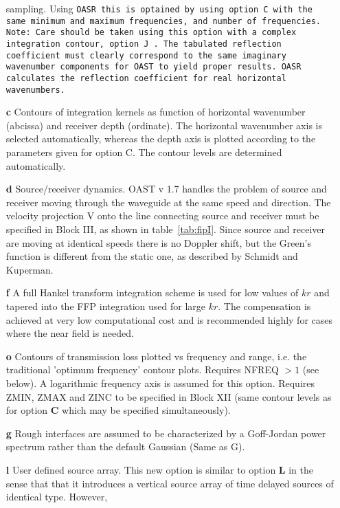 \begin{itemize}
sampling. Using \tt OASR \rm this is optained by using option \tt C
\rm with the same minimum and maximum frequencies, and number of frequencies.
Note: Care should be taken using this option with a complex
integration contour, option \tt J \rm. The tabulated reflection
coefficient must clearly correspond to the same imaginary wavenumber
components for \tt OAST \rm to yield proper results. \tt OASR \rm calculates
the reflection coefficient for real horizontal wavenumbers.
    \item[{\bf c}]     Contours   of  integration  kernels  as   function   of 
          horizontal  wavenumber  (abcissa)  and  receiver  depth           
          (ordinate). The horizontal wavenumber axis is  selected           
          automatically,  whereas  the  depth  axis  is   plotted           
          according  to  the parameters given for option  C.  The           
          contour levels are determined automatically.
\item[{\bf d}] Source/receiver dynamics. OAST v 1.7 handles the problem of
source and receiver moving through the waveguide at the same speed and
direction. The velocity projection V onto the line connecting source
and  receiver must be specified in Block III, as shown in
table~\ref{tab:fipI}. Since source and receiver are moving at identical
speeds there is no Doppler shift, but the Green's function is
different from the static one, as described by Schmidt and
Kuperman\cite{sk:jasa94}.
    \item[{\bf f}] A full Hankel transform integration scheme is used
for low values of $ kr $ and tapered into the FFP integration used for
large $ kr $. The compensation is achieved at very low computational
cost and is recommended highly for cases where the near field is
needed.   
    \item[{\bf o}] Contours of transmission loss plotted vs frequency
and range, i.e. the traditional 'optimum frequency' contour plots. 
Requires NFREQ $> 1$ (see below). A logarithmic frequency
axis is assumed for this option. Requires ZMIN, ZMAX and ZINC to be
specified in Block XII (same contour levels as for option {\bf C}
which may be specified simultaneously). 
    \item[{\bf g}] Rough interfaces are assumed to be characterized by
a Goff-Jordan power spectrum rather than the default Gaussian (Same as G). 
    \item[{\bf l}] User defined source array. This new option is
similar to option {\bf L} in the sense that that it introduces a
vertical source array of time delayed sources of identical type. However,

\end{itemize}
